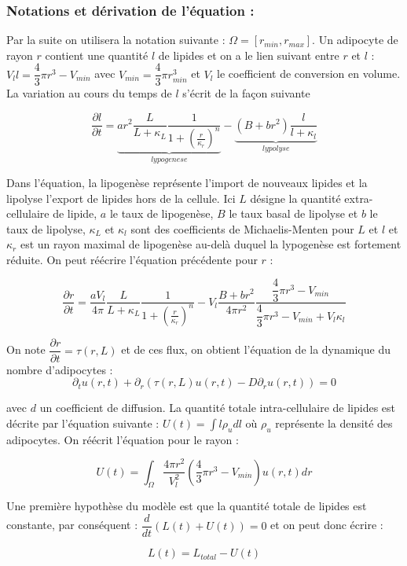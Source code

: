 \documentclass[a4paper,fleqn,leqno]{article}
\newcommand{\bint}{\displaystyle\int}
\begin{document}
\subsubsection*{Notations et dérivation de l'équation :}

Par la suite on utilisera la notation suivante : $\Omega = [r_{min},r_{max}]$.
Un adipocyte de rayon $r$ contient une quantité $l$ de lipides et on a le lien suivant entre $r$ et $l$ : $V_l l = \dfrac{4}{3}\pi r^3 - V_{min}$ avec $V_{min} = \dfrac{4}{3}\pi r^3_{min}$ et $V_l$ le coefficient de conversion en volume.
La variation au cours du temps de $l$ s'écrit de la façon suivante %

\[ \dfrac{\partial l}{\partial t} = \underbrace{ar^2 \dfrac{L}{L+\kappa_L}\dfrac{1}{1+(\frac{r}{\kappa_r})^n}}_{lypogenese} - \underbrace{(B+br^2)\dfrac{l}{l+\kappa_l}}_{lypolyse} \]

Dans l'équation, la lipogenèse représente l'import de nouveaux lipides et la lipolyse l'export de  lipides hors de la cellule. Ici $L$ désigne la quantité extra-cellulaire de lipide, $a$ le taux de lipogenèse, $B$ le taux basal de lipolyse et $b$ le taux de lipolyse, $\kappa_L$ et $\kappa_l$ sont des coefficients de Michaelis-Menten pour $L$ et $l$ et $\kappa_r$ est un rayon maximal de lipogenèse au-delà duquel la lypogenèse est fortement réduite. On peut réécrire l'équation précédente pour $r$ :

\[ \dfrac{\partial r}{\partial t} = \dfrac{aV_l}{4\pi} \dfrac{L}{L+\kappa_L}\dfrac{1}{1+(\frac{r}{\kappa_r})^n} - V_l\dfrac{B+br^2}{4\pi r^2}\dfrac{\dfrac{4}{3}\pi r^3 - V_{min}}{\dfrac{4}{3}\pi r^3 - V_{min}+V_l\kappa_l}\]

On note $\dfrac{\partial r}{\partial t} = \tau(r,L)$ et de ces flux, on obtient l'équation de la dynamique du nombre d'adipocytes :
\[ \partial_t u(r,t) +\partial_r(\tau(r,L)u(r,t) - D\partial_r u(r,t)) = 0 \]

avec $d$ un coefficient de diffusion. La quantité totale intra-cellulaire de lipides est décrite par l'équation suivante : $U(t) = \bint l\rho_u dl$ où $\rho_u$ représente la densité des adipocytes. On réécrit l'équation pour le rayon :

$$ U(t) = \bint_\Omega \dfrac{4\pi r^2}{V_l^2}(\dfrac{4}{3}\pi r^3 - V_{min})u(r,t)dr $$

Une première hypothèse du modèle est que la quantité totale de lipides est constante, par conséquent : $\dfrac{d}{dt}(L(t) + U(t)) = 0$ et on peut donc écrire :

$$L(t) = L_{total} - U(t)$$
\end{document}
